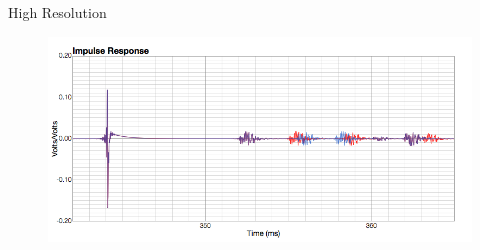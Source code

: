 \documentclass{beamer}
\begin{document}
\begin{frame}[t]{High Resolution}
\begin{figure}[b]
\includegraphics[height=0.37\textwidth]{figure/highresolution.png}
\end{figure}

\end{frame}
\end{document}
